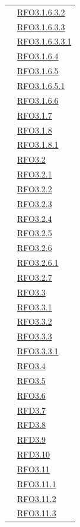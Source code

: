 \begin{longtable}{|>{\centering}m{5cm}|m{5cm}<{\centering}|}
& \hyperlink{RFO3.1.6.3.2}{RFO3.1.6.3.2}\\
& \hyperlink{RFO3.1.6.3.3}{RFO3.1.6.3.3}\\
& \hyperlink{RFO3.1.6.3.3.1}{RFO3.1.6.3.3.1}\\
& \hyperlink{RFO3.1.6.4}{RFO3.1.6.4}\\
& \hyperlink{RFO3.1.6.5}{RFO3.1.6.5}\\
& \hyperlink{RFO3.1.6.5.1}{RFO3.1.6.5.1}\\
& \hyperlink{RFO3.1.6.6}{RFO3.1.6.6}\\
& \hyperlink{RFO3.1.7}{RFO3.1.7}\\
& \hyperlink{RFO3.1.8}{RFO3.1.8}\\
& \hyperlink{RFO3.1.8.1}{RFO3.1.8.1}\\
& \hyperlink{RFO3.2}{RFO3.2}\\
& \hyperlink{RFO3.2.1}{RFO3.2.1}\\
& \hyperlink{RFO3.2.2}{RFO3.2.2}\\
& \hyperlink{RFO3.2.3}{RFO3.2.3}\\
& \hyperlink{RFO3.2.4}{RFO3.2.4}\\
& \hyperlink{RFO3.2.5}{RFO3.2.5}\\
& \hyperlink{RFO3.2.6}{RFO3.2.6}\\
& \hyperlink{RFO3.2.6.1}{RFO3.2.6.1}\\
& \hyperlink{RFO3.2.7}{RFO3.2.7}\\
& \hyperlink{RFO3.3}{RFO3.3}\\
& \hyperlink{RFO3.3.1}{RFO3.3.1}\\
& \hyperlink{RFO3.3.2}{RFO3.3.2}\\
& \hyperlink{RFO3.3.3}{RFO3.3.3}\\
& \hyperlink{RFO3.3.3.1}{RFO3.3.3.1}\\
& \hyperlink{RFO3.4}{RFO3.4}\\
& \hyperlink{RFO3.5}{RFO3.5}\\
& \hyperlink{RFO3.6}{RFO3.6}\\
& \hyperlink{RFD3.7}{RFD3.7}\\
& \hyperlink{RFD3.8}{RFD3.8}\\
& \hyperlink{RFD3.9}{RFD3.9}\\
& \hyperlink{RFD3.10}{RFD3.10}\\
& \hyperlink{RFO3.11}{RFO3.11}\\
& \hyperlink{RFO3.11.1}{RFO3.11.1}\\
& \hyperlink{RFO3.11.2}{RFO3.11.2}\\
& \hyperlink{RFO3.11.3}{RFO3.11.3}\\

\end{longtable}
